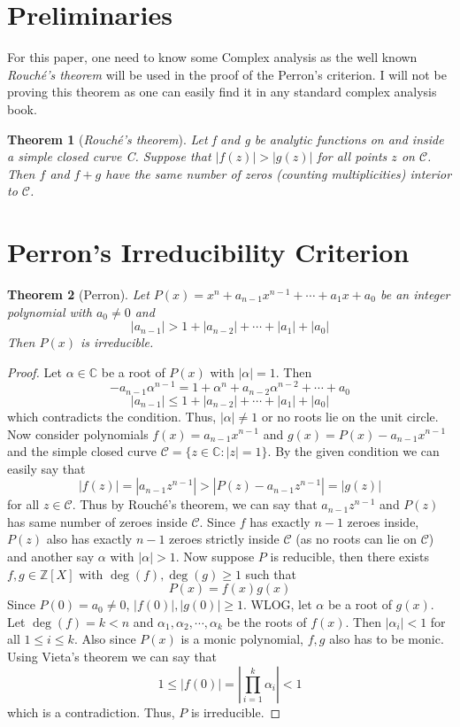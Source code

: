 \documentclass[11pt]{article}
\newtheorem{theorem}{Theorem}[section]
\theoremstyle{definition} %
\begin{document}
\section{Preliminaries}
For this paper, one need to know some Complex analysis as the well known \textit{Rouché's theorem} will be used in the proof of the Perron's criterion. I will not be proving this theorem
as one can easily find it in any standard complex analysis book.
\newpage

\begin{theorem}[\textit{Rouché's theorem}]
    Let f and g be analytic functions on and inside a simple closed curve C. Suppose
that $|f(z)| > |g(z)|$ for all points $z$ on $\mathcal{C}$. Then $f$ and $f + g$ have the same number of zeros (counting
multiplicities) interior to $\mathcal{C}$.
\end{theorem}

\section{Perron's Irreducibility Criterion}
\begin{theorem}[Perron]
    Let $P(x) = x^n + a_{n-1} x^{n-1} +\cdots+ a_1 x + a_0$ be an integer polynomial with $a_0\neq 0$ and
    $$|a_{n-1}|>1+|a_{n-2}|+\cdots+|a_1|+|a_0|$$
Then $P(x)$ is irreducible.
\end{theorem}
\begin{proof}
    Let $\alpha\in \mathbb{C}$ be a root of $P(x)$ with $|\alpha|=1$. Then
    $$-a_{n-1}\alpha^{n-1}=1+\alpha^n+a_{n-2}\alpha^{n-2}+\cdots+a_0$$
    $$|a_{n-1}|\le 1+ |a_{n-2}|+\cdots +|a_1|+|a_0|$$ which contradicts the condition. Thus, 
    $|\alpha|\neq 1$ or no roots lie on the unit circle. Now consider polynomials $f(x)=a_{n-1}x^{n-1}$ and $g(x)=P(x)-a_{n-1}x^{n-1}$ and the simple closed curve 
    $\mathcal{C}=\{z\in \mathbb{C}: |z|=1\}$. By the given condition we can easily say that 
    $$|f(z)|=|a_{n-1}z^{n-1}|>|P(z)-a_{n-1}z^{n-1}|=|g(z)|$$ for all $z\in \mathcal{C}$. Thus by  Rouché's theorem, we can say that $a_{n-1}z^{n-1}$ and $P(z)$ has same number of zeroes inside $\mathcal{C}$. 
    Since $f$ has exactly $n-1$ zeroes inside, $P(z)$ also has exactly $n-1$ zeroes strictly inside $\mathcal{C}$ (as no roots can lie on $\mathcal{C}$) and another say $\alpha $ with $|\alpha|>1$. 
    Now suppose $P$ is reducible, then there exists $f,g\in \mathbb{Z}[X]$ with $\deg(f),\deg(g)\ge 1$ such that $$P(x)=f(x)g(x)$$ Since $P(0)=a_0\neq 0$, $|f(0)|,|g(0)|\ge 1$.
    WLOG, let $\alpha$ be a root of $g(x)$. Let $\deg(f)=k<n$ and $\alpha_1,\alpha_2,\cdots, \alpha_k$ be the roots of $f(x)$. Then $|\alpha_i|<1$ for all $1\le i\le k$. Also since $P(x)$ is a monic polynomial, $f,g$ also has to be
    monic. Using Vieta's theorem we can say that  $$1\le |f(0)|=\left|\prod_{i=1}^k\alpha_i\right|<1$$ which is a contradiction. Thus, $P$ is irreducible.
\end{proof}
\newpage
\end{document}

